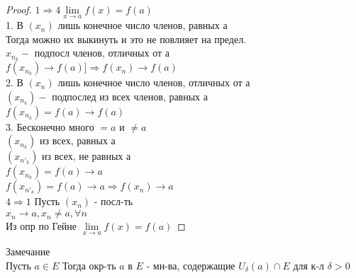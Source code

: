 \begin{definition}
\begin{proof}
	 $ 1 \Rightarrow 4 \lim\limits_{x \rightarrow a} f(x) = f(a) $ \\
	 1. В $ (x_n) $ лишь конечное число членов, равных а \\
	 Тогда можно их выкинуть и это не повлияет на предел. \\
	 $ x_{n_k} -$  подпосл членов, отличных от а \\
	 $ f(x_{n_k}) \rightarrow f(a) ]\Rightarrow f(x_n) \rightarrow f(a)$ \\
	 2. В $	(x_n) $ лишь конечное число членов, отличных от а \\
	 $ (x_{n_k}) - $ подпослед из всех членов, равных а \\
	 $ f(x_{n_k}) = f(a) \rightarrow f(a) $\\
	 3. Бесконечно много $ = a$ и $ \neq a $ \\
	 $ (x_{n_k}) $ из всех, равных а \\
	 $ (x_{n'_k}) $ из всех, не равных а \\
	  $ f(x_{n_k}) = f(a) \rightarrow a $\\
	   $ f(x_{n'_k}) = f(a) \rightarrow a \Rightarrow f(x_n) \rightarrow a$\\
	 $ 4 \Rightarrow 1  $ Пусть $(x_n) $ - посл-ть \\
	 $ x_n \rightarrow a, x_n \neq a, \forall n $ \\
	 Из опр по Гейне $ \lim\limits_{x \rightarrow a} f(x) = f(a) $
	  \end{proof}
	 
\end{definition}
Замечание\\
Пусть $ a \in E $ Тогда окр-ть $a$ в $ E $ - мн-ва, содержащие $ U_{\delta} (a) \cap E $ для к-л $ \delta > 0 $ \\


